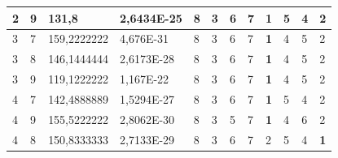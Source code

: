 \documentclass[conference]{IEEEtran}
\begin{document}
\begin{table}[]
\begin{tabular}{|llll|llllllll|}
		\multicolumn{1}{|l|}{2}   & \multicolumn{1}{l|}{9}         & \multicolumn{1}{l|}{131,8}         & 2,6434E-25 & \multicolumn{1}{l|}{8}   & \multicolumn{1}{l|}{3}   & \multicolumn{1}{l|}{6}   & \multicolumn{1}{l|}{7}   & \multicolumn{1}{l|}{\textbf{1}} & \multicolumn{1}{l|}{5}   & \multicolumn{1}{l|}{4}   & 2                      \\ \hline
		\multicolumn{1}{|l|}{3}   & \multicolumn{1}{l|}{7}         & \multicolumn{1}{l|}{159,2222222}   & 4,676E-31  & \multicolumn{1}{l|}{8}   & \multicolumn{1}{l|}{3}   & \multicolumn{1}{l|}{6}   & \multicolumn{1}{l|}{7}   & \multicolumn{1}{l|}{\textbf{1}} & \multicolumn{1}{l|}{4}   & \multicolumn{1}{l|}{5}   & 2                      \\ \hline
		\multicolumn{1}{|l|}{3}   & \multicolumn{1}{l|}{8}         & \multicolumn{1}{l|}{146,1444444}   & 2,6173E-28 & \multicolumn{1}{l|}{8}   & \multicolumn{1}{l|}{3}   & \multicolumn{1}{l|}{6}   & \multicolumn{1}{l|}{7}   & \multicolumn{1}{l|}{\textbf{1}} & \multicolumn{1}{l|}{4}   & \multicolumn{1}{l|}{5}   & 2                      \\ \hline
		\multicolumn{1}{|l|}{3}   & \multicolumn{1}{l|}{9}         & \multicolumn{1}{l|}{119,1222222}   & 1,167E-22  & \multicolumn{1}{l|}{8}   & \multicolumn{1}{l|}{3}   & \multicolumn{1}{l|}{6}   & \multicolumn{1}{l|}{7}   & \multicolumn{1}{l|}{\textbf{1}} & \multicolumn{1}{l|}{4}   & \multicolumn{1}{l|}{5}   & 2                      \\ \hline
		\multicolumn{1}{|l|}{4}   & \multicolumn{1}{l|}{7}         & \multicolumn{1}{l|}{142,4888889}   & 1,5294E-27 & \multicolumn{1}{l|}{8}   & \multicolumn{1}{l|}{3}   & \multicolumn{1}{l|}{6}   & \multicolumn{1}{l|}{7}   & \multicolumn{1}{l|}{\textbf{1}} & \multicolumn{1}{l|}{5}   & \multicolumn{1}{l|}{4}   & 2                      \\ \hline
		\multicolumn{1}{|l|}{4}   & \multicolumn{1}{l|}{9}         & \multicolumn{1}{l|}{155,5222222}   & 2,8062E-30 & \multicolumn{1}{l|}{8}   & \multicolumn{1}{l|}{3}   & \multicolumn{1}{l|}{5}   & \multicolumn{1}{l|}{7}   & \multicolumn{1}{l|}{\textbf{1}} & \multicolumn{1}{l|}{4}   & \multicolumn{1}{l|}{6}   & 2                      \\ \hline
		\multicolumn{1}{|l|}{4}   & \multicolumn{1}{l|}{8}         & \multicolumn{1}{l|}{150,8333333}   & 2,7133E-29 & \multicolumn{1}{l|}{8}   & \multicolumn{1}{l|}{3}   & \multicolumn{1}{l|}{6}   & \multicolumn{1}{l|}{7}   & \multicolumn{1}{l|}{2}          & \multicolumn{1}{l|}{5}   & \multicolumn{1}{l|}{4}   & \textbf{1}             \\ \hline

\end{tabular}
\end{table}
\end{document}
